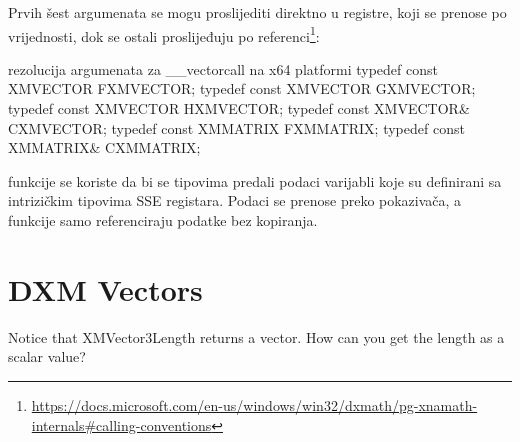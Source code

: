 Prvih šest argumenata se mogu proslijediti direktno u registre, koji se prenose po vrijednosti, dok se ostali proslijeđuju po referenci\footnote{\url{https://docs.microsoft.com/en-us/windows/win32/dxmath/pg-xnamath-internals\#calling-conventions}}:

\begin{codesection}
\begin{C++}{rezolucija argumenata za \_\_vectorcall na x64 platformi}{}
typedef const XMVECTOR  FXMVECTOR;
typedef const XMVECTOR  GXMVECTOR;
typedef const XMVECTOR  HXMVECTOR;
typedef const XMVECTOR& CXMVECTOR;
typedef const XMMATRIX  FXMMATRIX;
typedef const XMMATRIX& CXMMATRIX;
\end{C++}
\end{codesection}

\pagebreak

 funkcije se koriste da bi se  tipovima predali podaci varijabli koje su definirani sa intrizičkim tipovima SSE registara. Podaci se prenose preko pokazivača, a  funkcije samo referenciraju podatke bez kopiranja.

\begin{codelisting}
	
\end{codelisting}

\pagebreak

\section{DXM Vectors}
\label{sec:vec}
\setcounter{lstlisting}{0}

\begin{codelisting}
	
\end{codelisting}

\QandA
{Notice that XMVector3Length returns a vector. How can you get the length as a scalar value?}
{}

\begin{codesection}
	
\end{codesection}


